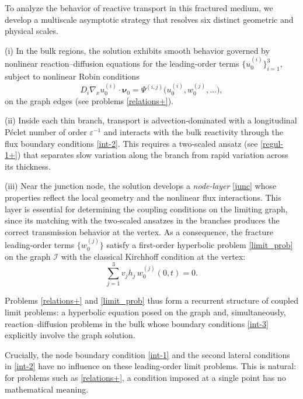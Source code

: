 \documentclass[reqno]{amsart}            %
\numberwithin{equation}{section}
\begin{document}
	To analyze the behavior of reactive transport in this fractured medium, we develop a multiscale asymptotic strategy that resolves six  distinct geometric and physical scales.
	
	(i) In the bulk regions, the solution exhibits smooth behavior governed by nonlinear reaction–diffusion equations for the leading-order terms $\{u^{(i)}_0\}_{i=1}^3$, subject to nonlinear Robin conditions 
	\begin{equation}\label{int-3}
		D_i\nabla_x u^{(i)}_0\cdot\boldsymbol{\nu}_0
		=  \Psi^{(i,j)}\big(u^{(i)}_0,w^{(j)}_0, \ldots\big),
	\end{equation}
	on the graph edges (see problems \eqref{relations+}).
	
	
	(ii) Inside each thin branch, transport is advection‑dominated with a longitudinal Péclet number of order $\varepsilon^{-1}$ and interacts with the bulk reactivity through the flux boundary conditions \eqref{int-2}. This requires a two‑scaled ansatz (see \eqref{regul-1+}) that separates slow variation along the branch from rapid variation across its thickness.
	
	(iii) Near the junction node, the solution develops a \textit{node-layer} \eqref{junc} whose properties reflect the local geometry and the nonlinear flux interactions. This layer is essential for determining the coupling conditions on the limiting graph, since its matching with the two‑scaled ansatzes in the branches produces the correct transmission behavior at the vertex.
	As a consequence, the fracture leading-order terms $\{w_0^{(j)}\}$ satisfy a first-order hyperbolic problem \eqref{limit_prob} on the graph $\mathcal{I}$ with the classical Kirchhoff condition at the vertex:
	\begin{equation}\label{Kirch-1}
		\sum_{j=1}^3 v_j h_j\, w_0^{(j)}(0,t)=0.
	\end{equation}
	
	Problems \eqref{relations+} and \eqref{limit_prob} thus form a recurrent structure of coupled limit problems: a hyperbolic equation posed on the graph and, simultaneously, reaction–diffusion problems in the bulk whose boundary conditions \eqref{int-3} explicitly involve the graph solution.
	
	Crucially, the node boundary condition \eqref{int-1} and the second lateral conditions in \eqref{int-2} have no influence on these leading-order limit problems. This is natural: for problems such as \eqref{relations+}, a condition imposed at a single point has no mathematical meaning.
	
\end{document}
